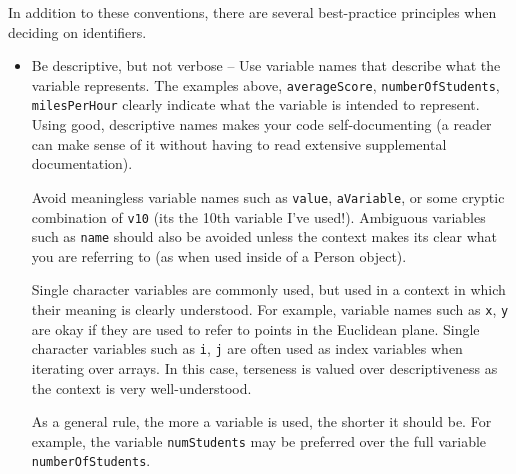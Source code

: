 In addition to these conventions, there are several best-practice principles when deciding
on identifiers.
\begin{itemize}
  \item Be descriptive, but not verbose -- Use variable names that describe what the
  	variable represents.  The examples above, \texttt{averageScore}, 
	\texttt{numberOfStudents}, \texttt{milesPerHour} clearly indicate
	what the variable is intended to represent.  Using good, descriptive names makes
	your code self-documenting (a reader can make sense of it without having to 
	read extensive supplemental documentation).

	Avoid meaningless variable names such as \texttt{value}, \texttt{aVariable}, 
	or some cryptic combination of \texttt{v10} (its the 10th variable I've used!).  
	Ambiguous variables such as \texttt{name} should also be avoided unless the
	context makes its clear what you are referring to (as when used inside of a Person
	object).
	
	Single character variables are commonly used, but used in a context in which their
	meaning is clearly understood.  For example, variable names such as \texttt{x},
	\texttt{y} are okay if they are used to refer to points in the Euclidean plane.  
	Single character variables such as \texttt{i}, \texttt{j} are often used
	as index variables when iterating over arrays.  In this case, terseness is valued over
	descriptiveness as the context is very well-understood. 
	
	As a general rule, the more a variable is used, the shorter it should be.  For example,
	the variable \texttt{numStudents} may be preferred over the full variable 
	\texttt{numberOfStudents}.
	

\end{itemize}
